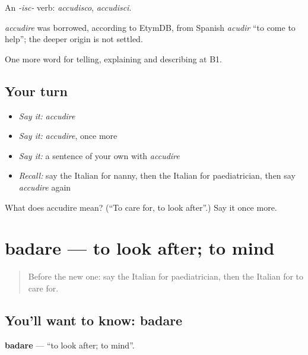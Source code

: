 An \emph{-isc-} verb: \emph{accudisco}, \emph{accudisci}.

\begin{cousinweb}
\emph{accudire} was borrowed, according to EtymDB, from Spanish \emph{acudir} \textquotedblleft{}to come to help\textquotedblright{}; the deeper origin is not settled.
\end{cousinweb}

\begin{grammarlens}[title={What you've built}]
One more word for telling, explaining and describing at B1.
\end{grammarlens}

\subsection*{Your turn}
\begin{itemize}
\raggedright
  \item \emph{Say it:} \emph{accudire}
  \item \emph{Say it:} \emph{accudire}, once more
  \item \emph{Say it:} a sentence of your own with \emph{accudire}
  \item \emph{Recall:} say the Italian for nanny, then the Italian for paediatrician, then say \emph{accudire} again
\end{itemize}

\begin{tcolorbox}[breakable,colback=teal!4,colframe=teal!35!black,title={Before you move on}]
What does accudire mean? (\textquotedblleft{}To care for, to look after\textquotedblright{}.) Say it once more.
\end{tcolorbox}
\section[badare]{badare — to look after; to mind}

\label{lesson:IT-C498-badare}



\begin{quote}
Before the new one: say the Italian for paediatrician, then the Italian for to care for.
\end{quote}

\subsection*{You'll want to know: badare}
\textbf{badare} — \textquotedblleft{}to look after; to mind\textquotedblright{}.

